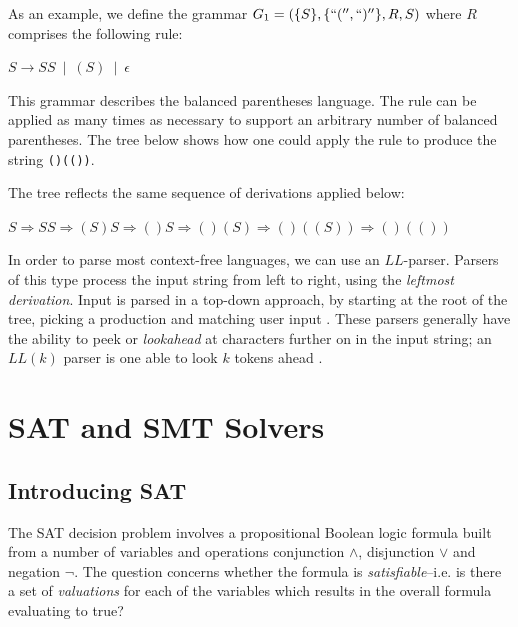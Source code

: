 \documentclass[a4paper,openany,12pt]{book}
\begin{document}
As an example, we define the grammar $G_1 = (\{S\}, \{``('', ``)''\}, R, S)$ where $R$ comprises the following rule:

\(
    S \to SS ~ \mid ~ (S) ~ \mid ~ \epsilon
\)

This grammar describes the balanced parentheses language.
The rule can be applied as many times as necessary to support an arbitrary number of balanced parentheses.
The tree below shows how one could apply the rule to produce the string \texttt{()(())}.


The tree reflects the same sequence of derivations applied below:

$S \Rightarrow SS \Rightarrow (S)S \Rightarrow ()S \Rightarrow ()(S) \Rightarrow ()((S)) \Rightarrow ()(())$

In order to parse most context-free languages, we can use an $LL$-parser.
Parsers of this type process the input string from left to right, using the \emph{leftmost derivation}.
Input is parsed in a top-down approach, by starting at the root of the tree, picking a production and matching user
input \citep[p.~141]{linz2006introduction}.
These parsers generally have the ability to peek or \emph{lookahead} at characters further on in the input string;
an $LL(k)$ parser is one able to look $k$ tokens ahead \citep{Grune:1990:PTP:130365}.

\section{SAT and SMT Solvers}

\subsection{Introducing SAT}

The SAT decision problem involves a propositional Boolean logic formula built from a number of variables and operations
conjunction $\land$, disjunction $\lor$ and negation $\neg$.
The question concerns whether the formula is \emph{satisfiable}--i.e. is there a set of \emph{valuations} for each of
the variables which results in the overall formula evaluating to true?
\end{document}
